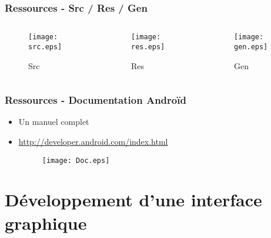 \documentclass{beamer}
\begin{document}
\begin{frame}
  \frametitle{Ressources - Src / Res / Gen}
    \begin{columns}
            \begin{column}{0.33\textwidth}
                \begin{figure}[t]
                    \centering
                    \texttt{[image: src.eps]}
                        \caption{Src}
                \end{figure}
            \end{column}
            \pause
            \begin{column}{0.33\textwidth}
                \begin{figure}[t]
                    \centering
                        \texttt{[image: res.eps]}
                        \caption{Res}
                \end{figure}
            \end{column}
            \pause
           \begin{column}{0.33\textwidth}
                \begin{figure}[t]
                    \centering
                        \texttt{[image: gen.eps]}
                        \caption{Gen}
                \end{figure}
            \end{column}
    \end{columns}
\end{frame}



\begin{frame}
  \frametitle{Ressources - Documentation Androïd}
    \begin{itemize}
        \item Un manuel complet
        \item \url{http://developer.android.com/index.html}
        \begin{figure}
                    \centering
                        \texttt{[image: Doc.eps]}
        \end{figure}
    \end{itemize}
\end{frame}


\section{Développement d'une interface graphique}
\end{document}
